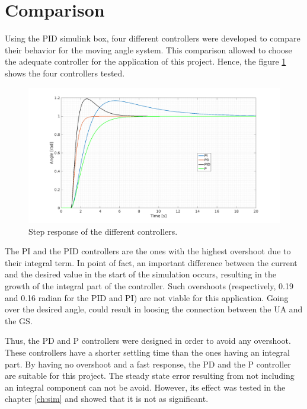\section{Comparison}
Using the PID simulink box, four different controllers were developed to compare their behavior for the moving angle system. This comparison allowed to choose the adequate controller for the application of this project. Hence, the figure \ref{fig:comp_pid} shows the four controllers tested.

\begin{figure}[H]
\centerline{
\includegraphics[scale=0.35]{figures/full_comp.png}}
\caption{Step response of the different controllers.}
\label{fig:comp_pid}
\end{figure}

The PI and the PID controllers are the ones with the highest overshoot due to their integral term. In point of fact, an important difference between the current and the desired value in the start of the simulation occurs, resulting in the growth of the integral part of the controller. 
Such overshoots (respectively, 0.19 and 0.16 radian for the PID and PI) are not viable for this application. Going over the desired angle, could result in loosing the connection between the UA and the GS.

Thus, the PD and P controllers were designed in order to avoid any overshoot. These controllers have a shorter settling time than the ones having an integral part. By having no overshoot and a fast response, the PD and the P controller are suitable for this project. The steady state error resulting from not including an integral component can not be avoid. However, its effect was tested in the chapter \ref{ch:sim} and showed that it is not as significant.

\vspace{5mm}

